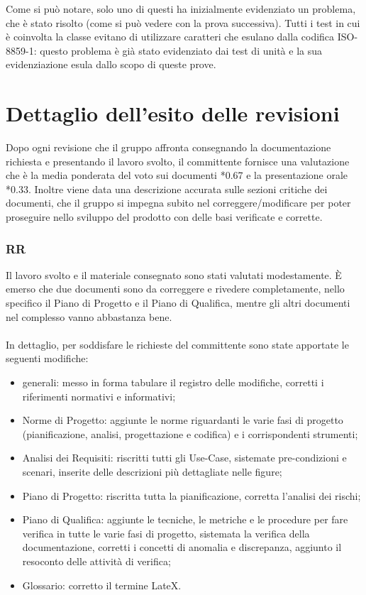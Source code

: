 Come si pu\`o notare, solo uno di questi ha inizialmente evidenziato un
problema, che \`e stato risolto (come si pu\`o vedere con la prova successiva).
Tutti i test in cui \`e coinvolta la classe  evitano di
utilizzare caratteri che esulano dalla codifica ISO-8859-1: questo problema \`e
gi\`a stato evidenziato dai test di unit\`a e la sua evidenziazione esula dallo
scopo di queste prove.


\section{Dettaglio dell'esito delle revisioni}
Dopo ogni revisione che il gruppo affronta consegnando la documentazione
richiesta e presentando il lavoro svolto, il committente fornisce una
valutazione che \`e la media ponderata del voto sui documenti *0.67 e la
presentazione orale *0.33. Inoltre viene data una descrizione accurata
sulle sezioni critiche dei documenti, che il gruppo si impegna subito
nel correggere/modificare per poter proseguire nello sviluppo del prodotto con delle
basi verificate e corrette.

\subsubsection*{RR}
Il lavoro svolto e il materiale consegnato sono stati valutati modestamente. \`E
emerso che due documenti sono da correggere e rivedere completamente, nello
specifico il Piano di Progetto e il Piano di Qualifica, mentre gli altri documenti nel complesso
vanno abbastanza bene. \\ \\
In dettaglio, per soddisfare le richieste del committente sono state apportate
le seguenti modifiche:
\begin{itemize}
  \item generali: messo in forma tabulare il registro delle modifiche, corretti
  i riferimenti normativi e informativi;
  \item Norme di Progetto: aggiunte le norme riguardanti le varie fasi di
  progetto (pianificazione, analisi, progettazione e codifica) e i corrispondenti strumenti;
  \item Analisi dei Requisiti: riscritti tutti gli Use-Case, sistemate pre-condizioni e scenari,
  inserite delle descrizioni pi\`u dettagliate nelle figure;
  \item Piano di Progetto: riscritta tutta la pianificazione, corretta l'analisi
  dei rischi;
  \item Piano di Qualifica: aggiunte le tecniche, le metriche e le procedure per
  fare verifica in tutte le varie fasi di progetto, sistemata la verifica della
  documentazione, corretti i concetti di anomalia e discrepanza, aggiunto
  il resoconto delle attivit\`a di verifica;
  \item Glossario: corretto il termine LateX.
\end{itemize}

